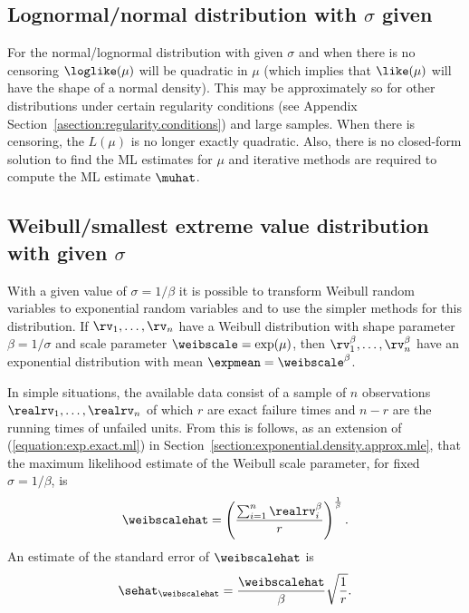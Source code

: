 \subsection{Lognormal/normal distribution with $\sigma$ given}
\label{section:known.sigma.inference}
For the normal/lognormal distribution with given $\sigma$ and when
there is no censoring $\loglike(\mu)$ will be quadratic in $\mu$
(which implies that $\like(\mu)$ will have the shape of a normal 
density).  This may be approximately so for other distributions
under certain regularity conditions (see
Appendix Section~\ref{asection:regularity.conditions}) and large samples.
When there is censoring, the $L(\mu)$ is no longer exactly 
quadratic. Also, there is no closed-form solution to find the ML
estimates for $\mu$ and iterative methods are
required to compute the ML estimate $\muhat$.

\subsection{Weibull/smallest extreme value distribution with given $\sigma$}
With a given value of $\sigma=1/\beta$ it is possible to transform
Weibull random variables to exponential random variables and to use
the simpler methods for this distribution. If $\rv_{1},\ldots,
\rv_{n}$ have a Weibull distribution with shape parameter
$\beta=1/\sigma$ and scale parameter $\weibscale=\exp(\mu)$, then
$\rv_{1}^{\beta},\ldots, \rv_{n}^{\beta}$ have an exponential
distribution with mean $\expmean=\weibscale^{\beta}$.

In simple situations, the available data consist of a sample of $n$
observations $\realrv_{1},\ldots,\realrv_{n}$ of which $r$ are exact
failure times and $n-r$ are the running times of unfailed
units. From this is follows, as an extension of
(\ref{equation:exp.exact.ml}) in
Section~\ref{section:exponential.density.approx.mle}, that the
maximum likelihood estimate of the Weibull scale parameter, for
fixed $\sigma=1/\beta$, is
\begin{equation}
\label{equation:weibull.known.shape.exact.ml}
\weibscalehat=\left(\frac{\sum_{i=1}^{n}\realrv_{i}^{\beta}}{r} 
	\right )^{\frac{1}{\beta}}.
\end{equation}
An estimate of the standard error of $\weibscalehat$ is
\begin{equation}
\label{equation:weibull.known.shape.exact.ml.se}
\sehat_{\weibscalehat} = \frac{\weibscalehat}{\beta}\sqrt{\frac{1}{r}}.
\end{equation}

